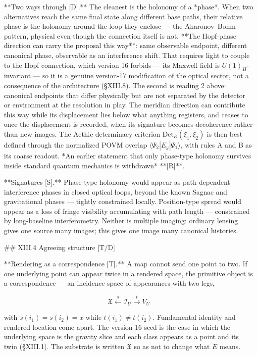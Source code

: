 **Two ways through [D].** The cleanest is the holonomy of a *phase*. When two alternatives reach the same final state along different base paths, their relative phase is the holonomy around the loop they enclose — the Aharonov–Bohm pattern, physical even though the connection itself is not. **The Hopf-phase direction can carry the proposal this way**: same observable endpoint, different canonical phase, observable as an interference shift. That requires light to couple to the Hopf connection, which version 16 forbids — its Maxwell field is $U(1)_H$-invariant — so it is a genuine version-17 modification of the optical sector, not a consequence of the architecture (§XIII.8). The second is reading 2 above: canonical endpoints that differ physically but are not separated by the detector or environment at the resolution in play. The meridian direction can contribute this way while its displacement lies below what anything registers, and ceases to once the displacement is recorded, when its signature becomes decoherence rather than new images. The Aethic determinacy criterion $\mathrm{Det}_R(\xi_1,\xi_2)$ is then best defined through the normalized POVM overlap $\langle\Psi_2|E_y|\Psi_1\rangle$, with rules A and B as its coarse readout. *An earlier statement that only phase-type holonomy survives inside standard quantum mechanics is withdrawn* **[R]**.

**Signatures [S].** Phase-type holonomy would appear as path-dependent interference phases in closed optical loops, beyond the known Sagnac and gravitational phases — tightly constrained locally. Position-type spread would appear as a loss of fringe visibility accumulating with path length — constrained by long-baseline interferometry. Neither is multiple imaging: ordinary lensing gives one source many images; this gives one image many canonical histories.

## XIII.4 Agreeing structure [T/D]

**Rendering as a correspondence [T].** A map cannot send one point to two. If one underlying point can appear twice in a rendered space, the primitive object is a correspondence — an incidence space of appearances with two legs,

$$\mathfrak X\xleftarrow{\;s\;}\mathcal I_U\xrightarrow{\;t\;}V_U$$

with $s(i_1) = s(i_2) = x$ while $t(i_1)\neq t(i_2)$. Fundamental identity and rendered location come apart. The version-16 seed is the case in which the underlying space is the gravity slice and each class appears as a point and its twin (§XIII.1). The substrate is written $\mathfrak X$ so as not to change what $E$ means.


